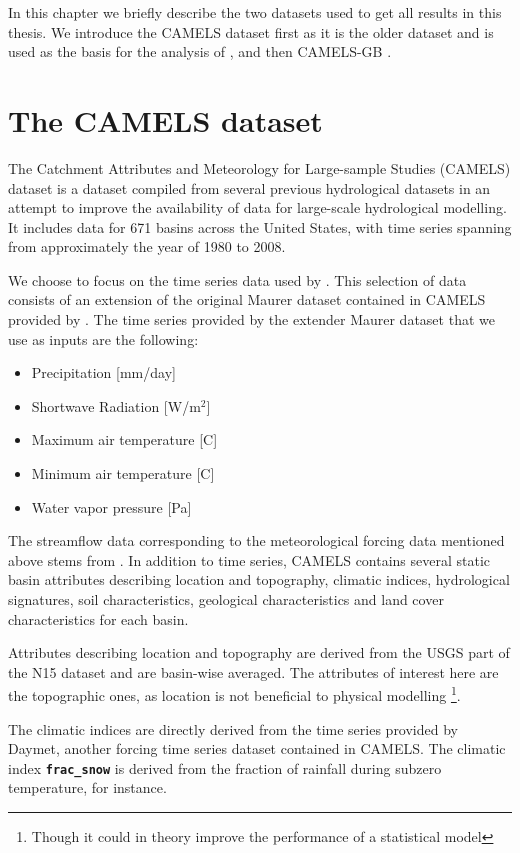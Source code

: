 In this chapter we briefly describe the two datasets used to get all results in 
this thesis. We introduce the CAMELS dataset \citep{CAMELS_US} first as it is the 
older dataset and is used as the basis for the analysis of 
\citet{lstm_first_paper, lstm_second_paper, lstm_third_paper}, and then CAMELS-GB 
\cite{CAMELS_GB}.
\section{The CAMELS dataset}
The Catchment Attributes and Meteorology for Large-sample Studies (CAMELS) dataset \citep{CAMELS_US}
is a dataset compiled from several previous hydrological datasets in an attempt to 
improve the availability of data for large-scale hydrological modelling. It includes 
data for 671 basins across the United States, with time series spanning from 
approximately the year of 1980 to 2008.

We choose to focus on the time series data 
used by \citet{lstm_second_paper}. This selection of data consists of an extension 
of the original Maurer dataset contained in CAMELS provided by \citet{maurer_hydroshare}.
The time series provided by the extender Maurer dataset that we use as inputs are 
the following:
\begin{itemize}
    \item Precipitation [mm/day]
    \item Shortwave Radiation [W/m$^2$]
    \item Maximum air temperature [C\degree]
    \item Minimum air temperature [C\degree]
    \item Water vapor pressure [Pa]
\end{itemize}

The streamflow data corresponding to the meteorological forcing data mentioned above 
stems from \citet{usgs_streamflow}.
In addition to time series, CAMELS contains several static basin attributes describing 
location and topography, climatic indices, hydrological signatures, soil characteristics, geological 
characteristics and land cover characteristics for each basin.

Attributes describing location and topography are derived from the USGS part of 
the N15 dataset and are basin-wise averaged. The attributes of interest here are the topographic ones, as 
location is not beneficial to physical modelling \footnote{Though it could in theory 
improve the performance of a statistical model}.

The climatic indices are directly derived from the time series provided by Daymet, 
another forcing time series dataset contained in CAMELS. The climatic index
\textbf{\texttt{frac\_snow}} is derived from the fraction of rainfall during 
subzero temperature, for instance. 

